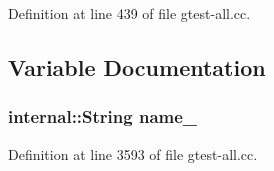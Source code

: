 \-Definition at line 439 of file gtest-\/all.\-cc.



\subsection{\-Variable \-Documentation}
\hypertarget{fused-src_2gtest_2gtest-all_8cc_a405ae26bae83121bb8a0991436141b78}{
\subsubsection[{name\-\_\-}]{\setlength{\rightskip}{0pt plus 5cm}internal\-::\-String {\bf name\-\_\-}}}\label{dc/dba/fused-src_2gtest_2gtest-all_8cc_a405ae26bae83121bb8a0991436141b78}


\-Definition at line 3593 of file gtest-\/all.\-cc.

